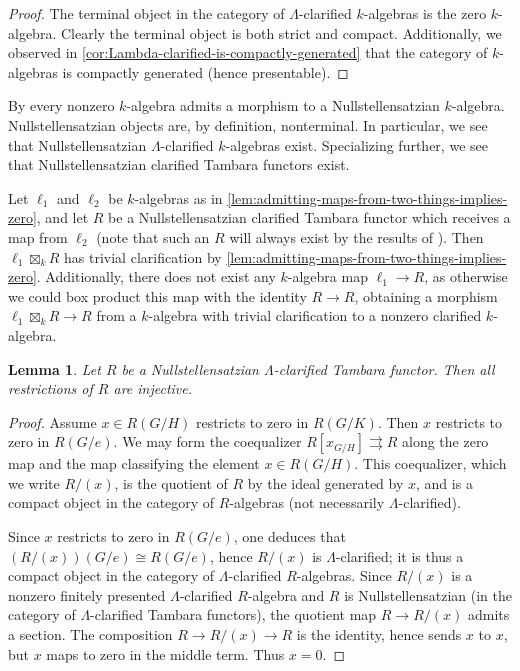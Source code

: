 \documentclass[11pt,dvipsnames]{amsart}
\newtheorem{lemma}[theorem]{Lemma}
\theoremstyle{BoldRemark}
\begin{document}
\begin{proof}
	The terminal object in the category of $\Lambda$-clarified $k$-algebras is the zero $k$-algebra. Clearly the terminal object is both strict and compact. Additionally, we observed in \cref{cor:Lambda-clarified-is-compactly-generated} that the category of $k$-algebras is compactly generated (hence presentable).
\end{proof}

By \cite[Proposition A.17]{BSY22} every nonzero $k$-algebra admits a morphism to a Nullstellensatzian $k$-algebra. Nullstellensatzian objects are, by definition, nonterminal. In particular, we see that Nullstellensatzian $\Lambda$-clarified $k$-algebras exist. Specializing further, we see that Nullstellensatzian clarified Tambara functors exist.

Let $\ell_1$ and $\ell_2$ be $k$-algebras as in \cref{lem:admitting-maps-from-two-things-implies-zero}, and let $R$ be a Nullstellensatzian clarified Tambara functor which receives a map from $\ell_2$ (note that such an $R$ will always exist by the results of \cite{BSY22}). Then $\ell_1 \boxtimes_k R$ has trivial clarification by \cref{lem:admitting-maps-from-two-things-implies-zero}. Additionally, there does not exist any $k$-algebra map $\ell_1 \rightarrow R$, as otherwise we could box product this map with the identity $R \rightarrow R$, obtaining a morphism $\ell_1 \boxtimes_k R \rightarrow R$ from a $k$-algebra with trivial clarification to a nonzero clarified $k$-algebra.

\begin{lemma}\label{lem:NSS-clarified-implies-MRC}
	Let $R$ be a Nullstellensatzian $\Lambda$-clarified Tambara functor. Then all restrictions of $R$ are injective.
\end{lemma}

\begin{proof}
	Assume $x \in R(G/H)$ restricts to zero in $R(G/K)$. Then $x$ restricts to zero in $R(G/e)$. We may form the coequalizer $R[x_{G/H}] \rightrightarrows R$ along the zero map and the map classifying the element $x \in R(G/H)$. This coequalizer, which we write $R/(x)$, is the quotient of $R$ by the ideal generated by $x$, and is a compact object in the category of $R$-algebras (not necessarily $\Lambda$-clarified). 
	
	Since $x$ restricts to zero in $R(G/e)$, one deduces that $\left( R/(x) \right)(G/e) \cong R(G/e)$, hence $R/(x)$ is $\Lambda$-clarified; it is thus a compact object in the category of $\Lambda$-clarified $R$-algebras. Since $R/(x)$ is a nonzero finitely presented $\Lambda$-clarified $R$-algebra and $R$ is Nullstellensatzian (in the category of $\Lambda$-clarified Tambara functors), the quotient map $R \rightarrow R/(x)$ admits a section. The composition $R \rightarrow R/(x) \rightarrow R$ is the identity, hence sends $x$ to $x$, but $x$ maps to zero in the middle term. Thus $x = 0$. 
\end{proof}
\end{document}
